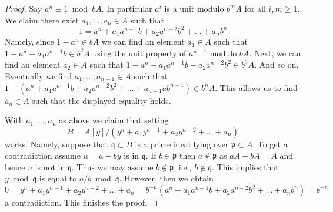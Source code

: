 \begin{proof}
Say $a^n \equiv 1 \bmod bA$. In particular $a^i$ is a unit modulo
$b^mA$ for all $i, m \geq 1$. We claim there exist
$a_1, \ldots, a_n \in A$ such that
$$
1 = a^n + a_1 a^{n - 1}b + a_2 a^{n - 2}b^2 + \ldots + a_n b^n
$$
Namely, since $1 - a^n \in bA$ we can find an element $a_1 \in A$
such that $1 - a^n - a_1 a^{n - 1} b \in b^2A$ using the unit property
of $a^{n - 1}$ modulo $bA$. Next, we can find an element $a_2 \in A$
such that $1 - a^n - a_1 a^{n - 1} b - a_2 a^{n - 2} b^2 \in b^3A$.
And so on. Eventually we find $a_1, \ldots, a_{n - 1} \in A$
such that $1 - (a^n + a_1 a^{n - 1}b + a_2 a^{n - 2}b^2 +
\ldots + a_{n - 1} ab^{n - 1}) \in b^nA$. This allows us to find
$a_n \in A$ such that the displayed equality holds.

\medskip\noindent
With $a_1, \ldots, a_n$ as above we claim that setting
$$
B = A[y]/(y^n + a_1 y^{n - 1} + a_2 y^{n - 2} + \ldots + a_n)
$$
works. Namely, suppose that $\mathfrak q \subset B$ is a prime ideal
lying over $\mathfrak p \subset A$. To get a contradiction
assume $u = a - by$ is in $\mathfrak q$. If $b \in \mathfrak p$
then $a \not \in \mathfrak p$ as $aA + bA = A$ and hence $u$ is not
in $\mathfrak q$. Thus we may assume $b \not \in \mathfrak p$, i.e.,
$b \not \in \mathfrak q$. This implies that $y \bmod \mathfrak q$
is equal to $a/b \bmod \mathfrak q$. However, then we obtain
$$
0 = y^n + a_1 y^{n - 1} + a_2 y^{n - 2} + \ldots + a_n =
b^{-n}(a^n + a_1 a^{n - 1}b + a_2 a^{n - 2}b^2 + \ldots + a_nb^n) =
b^{-n}
$$
a contradiction. This finishes the proof.
\end{proof}

